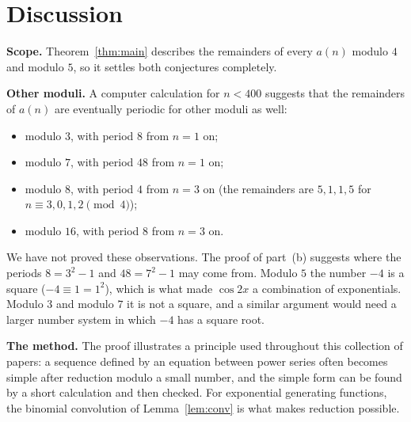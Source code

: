 \documentclass[11pt,a4paper]{article}
\theoremstyle{definition}
\theoremstyle{remark}
\newcommand{\para}[1]{\par\medskip\noindent\textbf{#1}\enspace}
\begin{document}
\section{Discussion}\label{sec:discussion}

\para{Scope.} Theorem~\ref{thm:main} describes the remainders of every $a(n)$ modulo $4$ and modulo $5$, so it settles
both conjectures completely.

\para{Other moduli.} A computer calculation for $n<400$ suggests that the remainders of $a(n)$ are eventually periodic
for other moduli as well:
\begin{itemize}
\item modulo $3$, with period $8$ from $n=1$ on;
\item modulo $7$, with period $48$ from $n=1$ on;
\item modulo $8$, with period $4$ from $n=3$ on (the remainders are $5,1,1,5$ for $n\equiv3,0,1,2\pmod 4$);
\item modulo $16$, with period $8$ from $n=3$ on.
\end{itemize}
We have not proved these observations. The proof of part~(b) suggests where the periods $8=3^2-1$ and $48=7^2-1$ may
come from. Modulo $5$ the number $-4$ is a square ($-4\equiv1=1^2$), which is what made $\cos2x$ a combination of
exponentials. Modulo $3$ and modulo $7$ it is not a square, and a similar argument would need a larger number system in
which $-4$ has a square root.

\para{The method.} The proof illustrates a principle used throughout this collection of papers: a sequence defined by
an equation between power series often becomes simple after reduction modulo a small number, and the simple form can
be found by a short calculation and then checked. For exponential generating functions, the binomial convolution of
Lemma~\ref{lem:conv} is what makes reduction possible.
\end{document}
